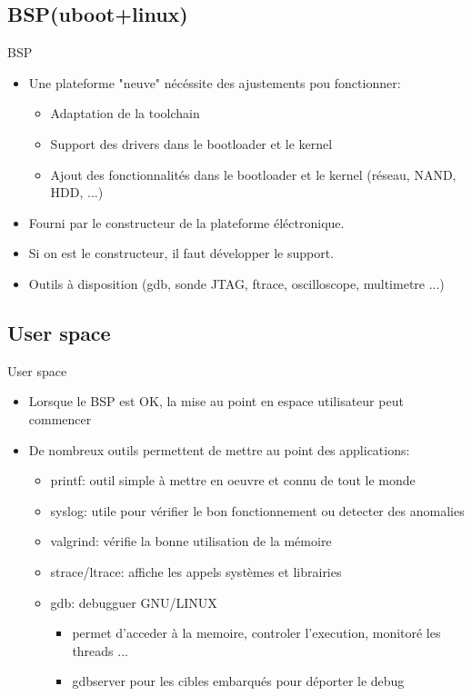 \subsection{BSP(uboot+linux)}
\begin{frame}{BSP}{}
  \begin{itemize}
  \item Une plateforme "neuve" nécéssite des ajustements pou fonctionner:
    \begin{itemize}
    \item Adaptation de la toolchain
    \item Support des drivers dans le bootloader et le kernel
    \item Ajout des fonctionnalités dans le bootloader et le kernel (réseau, NAND, HDD, ...)
    \end{itemize}
  \item Fourni par le constructeur de la plateforme éléctronique.
  \item Si on est le constructeur, il faut développer le support.
  \item Outils à disposition (gdb, sonde JTAG, ftrace, oscilloscope, multimetre ...)
  \end{itemize}
\end{frame}

\subsection{User space}
\begin{frame}{User space}{}
  \begin{itemize}
  \item Lorsque le BSP est OK, la mise au point en espace utilisateur peut commencer
  \item De nombreux outils permettent de mettre au point des applications:
    \begin{itemize}
    \item printf: outil simple à mettre en oeuvre et connu de tout le monde
    \item syslog: utile pour vérifier le bon fonctionnement ou detecter des anomalies
    \item valgrind: vérifie la bonne utilisation de la mémoire
    \item strace/ltrace: affiche les appels systèmes et librairies
    \item gdb: debugguer GNU/LINUX
      \begin{itemize}
      \item permet d'acceder à la memoire, controler l'execution, monitoré les threads ...
      \item gdbserver pour les cibles embarqués pour déporter le debug
      \end{itemize}
    \end{itemize}
  \end{itemize}
\end{frame}
